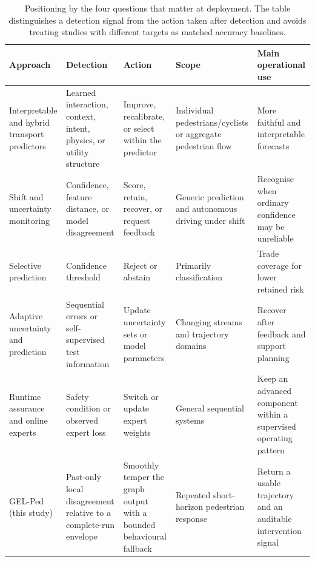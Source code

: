 \begin{table}[!htbp]
\centering
\caption{Positioning by the four questions that matter at deployment. The table distinguishes a detection signal from the action taken after detection and avoids treating studies with different targets as matched accuracy baselines.}
\label{tab:positioning_referee3}
\footnotesize
\renewcommand{\arraystretch}{1.12}
\begin{tabularx}{\textwidth}{>{\raggedright\arraybackslash}p{}>{\raggedright\arraybackslash}p{}>{\raggedright\arraybackslash}p{}>{\raggedright\arraybackslash}p{}X}
\toprule
Approach & Detection & Action & Scope & Main operational use \\
\midrule
Interpretable and hybrid transport predictors \citep{liu2024,mai2025,munir2025,li2023cyclist}
& Learned interaction, context, intent, physics, or utility structure
& Improve, recalibrate, or select within the predictor
& Individual pedestrians/cyclists or aggregate pedestrian flow
& More faithful and interpretable forecasts \\

Shift and uncertainty monitoring \citep{ovadia2019uncertainty,lee2018mahalanobis,malinin2021shifts,filos2020distribution}
& Confidence, feature distance, or model disagreement
& Score, retain, recover, or request feedback
& Generic prediction and autonomous driving under shift
& Recognise when ordinary confidence may be unreliable \\

Selective prediction \citep{geifman2017selective,cortes2016rejection}
& Confidence threshold
& Reject or abstain
& Primarily classification
& Trade coverage for lower retained risk \\

Adaptive uncertainty and prediction \citep{gibbs2021adaptive,dixit2023adaptive,ivanovic2023adaptive,park2024t4p}
& Sequential errors or self-supervised test information
& Update uncertainty sets or model parameters
& Changing streams and trajectory domains
& Recover after feedback and support planning \\

Runtime assurance and online experts \citep{sha2001simplicity,herbster1998tracking,cesabianchi2006prediction}
& Safety condition or observed expert loss
& Switch or update expert weights
& General sequential systems
& Keep an advanced component within a supervised operating pattern \\

GEL-Ped (this study)
& Past-only local disagreement relative to a complete-run envelope
& Smoothly temper the graph output with a bounded behavioural fallback
& Repeated short-horizon pedestrian response
& Return a usable trajectory and an auditable intervention signal \\
\bottomrule
\end{tabularx}
\end{table}

